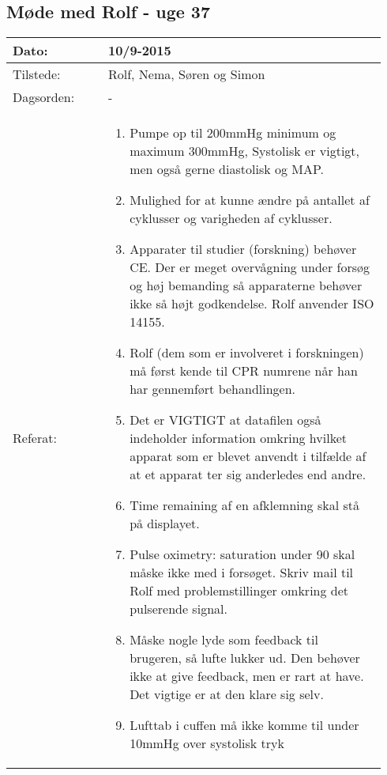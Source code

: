 	\subsection{Møde med Rolf - uge 37}
	\begin{longtable}{|p{0.24\linewidth}|p{0.7\linewidth}|}
		\hline
		Dato: & 10/9-2015\\ \hline
		Tilstede: & Rolf, Nema, Søren og Simon\\ \hline
		Dagsorden: & -
		\\ \hline
		Referat: & 
		\begin{enumerate}
			\item Pumpe op til 200mmHg minimum og maximum 300mmHg, Systolisk er vigtigt, men også gerne diastolisk og MAP.
			\item Mulighed for at kunne ændre på antallet af cyklusser og varigheden af cyklusser.
			\item Apparater til studier (forskning) behøver CE. Der er meget overvågning under forsøg og høj bemanding så apparaterne behøver ikke så højt godkendelse. Rolf anvender ISO 14155.
			\item Rolf (dem som er involveret i forskningen) må først kende til CPR numrene når han har gennemført behandlingen.
			\item Det er VIGTIGT at datafilen også indeholder information omkring hvilket apparat som er blevet anvendt i tilfælde af at et apparat ter sig anderledes end andre.
			\item Time remaining af en afklemning skal stå på displayet.
			\item Pulse oximetry: saturation under 90 skal måske ikke med i forsøget. Skriv mail til Rolf med problemstillinger omkring det pulserende signal.
			\item Måske nogle lyde som feedback til brugeren, så lufte lukker ud. Den behøver ikke at give feedback, men er rart at have. Det vigtige er at den klare sig selv.
			\item Lufttab i cuffen må ikke komme til under 10mmHg over systolisk tryk
		\end{enumerate}
		\\ \hline
	\end{longtable}
	
